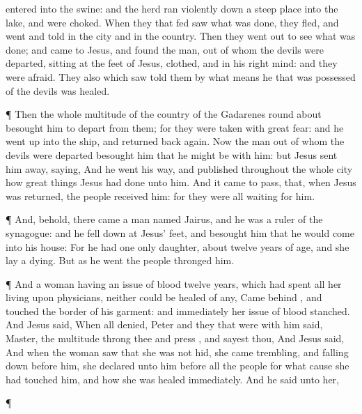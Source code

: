 {entered
into the
swine:
and the
herd ran
violently
down a steep
place
into the
lake,
and were
choked.
When they that
fed
{}
saw what was
done, they
fled,
and
went and
told
{}
in the
city
and
in the
country.
Then they went
out to
see what was
done;
and
came
to
Jesus,
and
found the
man, out
of
whom the
devils were
departed,
sitting
at the
feet of
Jesus,
clothed,
and in his right
mind:
and they were
afraid.
They
also
which
saw
{}
told them by what
means he that was possessed of the
devils was
healed.
\par }{\PP {}¶
Then the
whole
multitude of the
country of the
Gadarenes round
about
besought
him to
depart
from
them;
for they were taken
with
great
fear:
and
he went
up
into the
ship, and returned back
again.
Now the
man out
of
whom the
devils
were
departed
besought
him that he might be
with
him:
but
Jesus
sent
him
away,
saying,
And he went his
way, and
published
throughout the
whole
city how great
things
Jesus had
done unto
him.
And it came to pass,
that,
when
Jesus was
returned, the
people
{}
received
him:
for they
were
all
waiting for
him.
\par }{\PP {}¶
And,
behold, there
came a
man
named
Jairus,
and
he
was a
ruler of the
synagogue:
and he fell
down
at
Jesus’
feet, and
besought
him that he would
come
into
his
house:
For
he
had one
only
daughter,
about
twelve years of
age,
and
she lay a
dying.
But
as
he
went the
people
thronged
him.
\par }{\PP {}¶
And a
woman
having an
issue of
blood
twelve
years,
which had
spent
all her
living
upon
physicians,
neither
could be
healed
of
any,
Came
behind
{}, and
touched the
border of
his
garment:
and
immediately
her
issue of
blood
stanched.
And
Jesus
said,
{}
When
all
denied,
Peter
and they that were
with
him
said,
Master, the
multitude
throng
thee
and
press
{},
and sayest
thou,
{}
And
Jesus
said,
{}
And
when the
woman
saw
that she
was
not
hid, she
came
trembling,
and falling down
before
him, she
declared unto
him
before
all the
people
for
what
cause she had
touched
him,
and
how she was
healed
immediately.
And he
said unto
her,
{}
\par }{\PP {}¶
}
